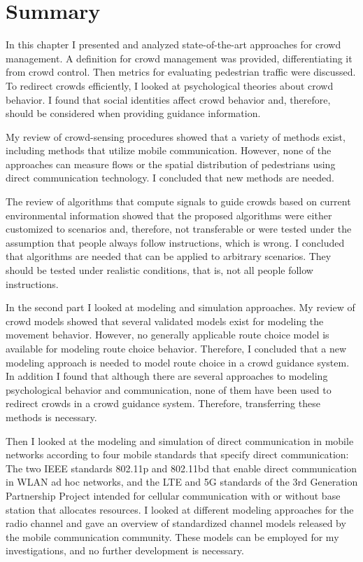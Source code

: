 \section{Summary}


In this chapter I presented and analyzed state-of-the-art approaches for crowd management. A definition for crowd management was provided, differentiating it from crowd control. Then metrics for evaluating pedestrian traffic were discussed. To redirect crowds efficiently, I looked at psychological theories about crowd behavior. I found that social identities affect crowd behavior and, therefore, should be considered when providing guidance information. 


My review of crowd-sensing procedures showed that a variety of methods exist, including methods that utilize mobile communication. However, none of the approaches can measure flows or the spatial distribution of pedestrians using direct communication technology. I concluded that new methods are needed. 


The review of algorithms that compute signals to guide crowds based on current environmental information showed that the proposed algorithms were either customized to scenarios and, therefore, not transferable or were tested under the assumption that people always follow instructions, which is wrong. I concluded that algorithms are needed that can be applied to arbitrary scenarios. They should be tested under realistic conditions, that is, not all people follow instructions.


In the second part I looked at modeling and simulation approaches. My review of crowd models showed that several validated models exist for modeling the movement behavior. However, no generally applicable route choice model is available for modeling route choice behavior. Therefore, I concluded that a new modeling approach is needed to model route choice in a crowd guidance system.
In addition I found that although there are several approaches to modeling psychological behavior and communication, none of them have been used to redirect crowds in a crowd guidance system. Therefore, transferring these methods is necessary. 


Then I looked at the modeling and simulation of direct communication in mobile networks according to four mobile standards that specify direct communication: The two IEEE standards 802.11p and 802.11bd that enable direct communication in WLAN ad hoc networks, and the LTE and 5G standards of the 3rd Generation Partnership Project intended for cellular communication with or without base station that allocates resources. I looked at different modeling approaches for the radio channel and gave an overview of standardized channel models released by the mobile communication community. These models can be employed for my investigations, and no further development is necessary. 



